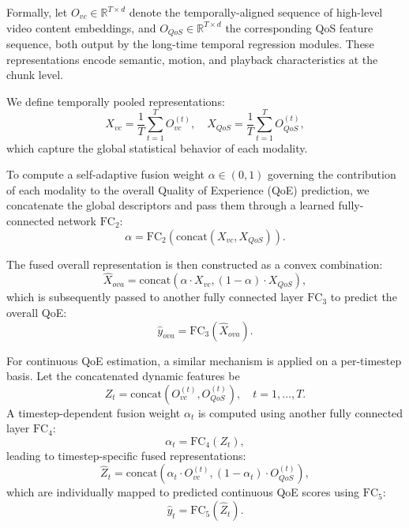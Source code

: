 Formally, let $O_{vc} \in \mathbb{R}^{T \times d}$ denote the temporally-aligned sequence of high-level video content embeddings, and $O_{QoS} \in \mathbb{R}^{T \times d}$ the corresponding QoS feature sequence, both output by the long-time temporal regression modules. These representations encode semantic, motion, and playback characteristics at the chunk level.

We define temporally pooled representations:
\begin{equation}
    X_{vc} = \frac{1}{T} \sum_{t=1}^{T} O_{vc}^{(t)}, \quad 
    X_{QoS} = \frac{1}{T} \sum_{t=1}^{T} O_{QoS}^{(t)},
\end{equation}
which capture the global statistical behavior of each modality.

To compute a self-adaptive fusion weight $\alpha \in (0, 1)$ governing the contribution of each modality to the overall Quality of Experience (QoE) prediction, we concatenate the global descriptors and pass them through a learned fully-connected network $\mathrm{FC}_2$:
\begin{equation}
    \alpha = \mathrm{FC}_2 \left( \mathrm{concat}(X_{vc}, X_{QoS}) \right).
\end{equation}

The fused overall representation is then constructed as a convex combination:
\begin{equation}
    \hat{X}_{ova} = \mathrm{concat} \left( \alpha \cdot X_{vc}, (1 - \alpha) \cdot X_{QoS} \right),
\end{equation}
which is subsequently passed to another fully connected layer $\mathrm{FC}_3$ to predict the overall QoE:
\begin{equation}
    \hat{y}_{ova} = \mathrm{FC}_3(\hat{X}_{ova}).
\end{equation}

For continuous QoE estimation, a similar mechanism is applied on a per-timestep basis. Let the concatenated dynamic features be
\begin{equation}
    Z_t = \mathrm{concat}(O_{vc}^{(t)}, O_{QoS}^{(t)}), \quad t = 1, \dots, T.
\end{equation}
A timestep-dependent fusion weight $\alpha_t$ is computed using another fully connected layer $\mathrm{FC}_4$:
\begin{equation}
    \alpha_t = \mathrm{FC}_4(Z_t),
\end{equation}
leading to timestep-specific fused representations:
\begin{equation}
    \hat{Z}_t = \mathrm{concat} \left( \alpha_t \cdot O_{vc}^{(t)}, (1 - \alpha_t) \cdot O_{QoS}^{(t)} \right),
\end{equation}
which are individually mapped to predicted continuous QoE scores using $\mathrm{FC}_5$:
\begin{equation}
    \hat{y}_t = \mathrm{FC}_5(\hat{Z}_t).
\end{equation}

